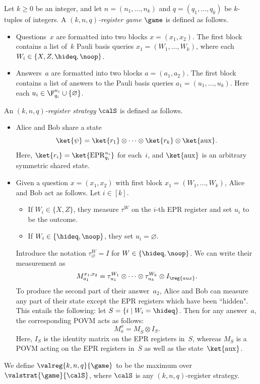 \begin{definition}\label{def:register}
Let $k \geq 0$ be an integer, and let $n = (n_1, \ldots, n_k)$ and $q = (q_1, \ldots, q_k)$ be $k$-tuples of integers.
A \emph{$(k, n, q)$-register game} $\game$ is defined as follows.
\begin{itemize}
\itemsep -.5pt
\item[$\circ$] Questions~$x$ are formatted into two blocks $x = (x_1, x_2)$. The first block contains a list of~$k$ Pauli basis queries
			$x_1 = (W_1, \ldots, W_k)$, where each $W_i \in \{X, Z, \hideq, \noop\}$.
\item[$\circ$] Answers~$a$ are formatted into two blocks $a = (a_1, a_2)$. The first block contains a list of answers to the Pauli basis queries $a_1 = (u_1, \ldots, u_k)$.
			Here each $u_i  \in \F_{q_i}^{n_i} \cup \{\varnothing\}$.
\end{itemize}
An \emph{$(k, n, q)$-register strategy} $\calS$ is defined as follows.
\begin{itemize}
\itemsep -.5pt
\item[$\circ$] Alice and Bob share a state
\begin{equation*}
\ket{\psi} = \ket{r_1} \otimes \cdots \otimes \ket{r_k} \otimes \ket{\mathrm{aux}}.
\end{equation*}
Here, $\ket{r_i} = \ket{\mathrm{EPR}_{q_i}^{n_i}}$ for each~$i$, and $\ket{\mathrm{aux}}$ is an arbitrary symmetric shared state.
\item[$\circ$] Given a question $x = (x_1, x_2)$ with first block $x_1 = (W_1, \ldots, W_k)$, Alice and Bob act as follows.
	Let $i \in [k]$.
	\begin{itemize}
	\item If $W_i \in \{X, Z\}$, they measure $\tau^{W}$ on the $i$-th EPR register and set $u_i$ to be the outcome.
	\item If $W_i \in \{\hideq, \noop\}$, they set $u_i = \varnothing$.
	\end{itemize}
	Introduce the notation $\tau_{\varnothing}^W = I$ for $W \in \{\hideq, \noop\}$.
	We can write their measurement as
	\begin{equation}\label{eq:in-math}
		M^{x_1, x_2}_{a_1} = \tau^{W_1}_{u_1} \otimes \cdots \otimes \tau^{W_k}_{u_k} \otimes I_{\reg{aux}}.
	\end{equation}
	To produce the second part of their answer~$a_2$, Alice and Bob can measure any part of their state except the EPR registers which have been ``hidden".	
	This entails the following: let $S = \{i \mid W_i = \hideq\}$.  Then for any answer~$a$, the corresponding POVM acts as follows:
	\begin{equation}\label{eq:hide-coords-in-S}
	M_a^x = M_{\overline{S}} \otimes I_{S}.
	\end{equation}
	Here, $I_{S}$ is the identity matrix on the EPR registers in~$S$,
	whereas $M_{\overline{S}}$ is a POVM acting on the EPR registers in~$\overline{S}$ as well as the state~$\ket{\mathrm{aux}}$.
\end{itemize}
We define $\valreg{k,n,q}{\game}$ to be the maximum over $\valstrat{\game}{\calS}$, where $\calS$ is any $(k, n, q)$-register strategy.
\end{definition}

